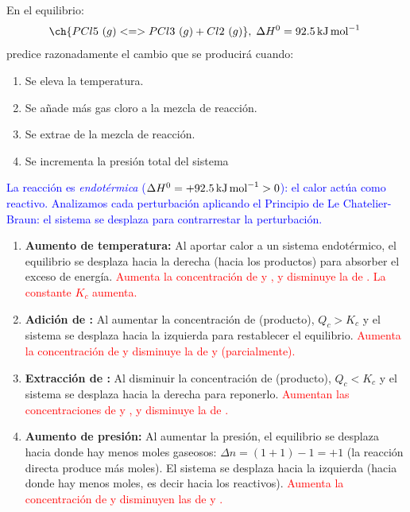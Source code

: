 \begin{exerciseEVAU}
    En el equilibrio:
    \begin{equation*}
        \ch{PCl5\ (g) <=> PCl3\ (g) + Cl2\ (g)},\; \Delta H^0 = \energia[kjmol]{92,5}
    \end{equation*}
    predice razonadamente el cambio que se producirá cuando:
    \begin{enumerate}[label=\letraminuscula]
        \item Se eleva la temperatura.
        \item Se añade más gas cloro a la mezcla de reacción.
        \item Se extrae  de la mezcla de reacción.
        \item Se incrementa la presión total del sistema
    \end{enumerate}

    \begin{solu}

    \textcolor{blue}{La reacción es \emph{endotérmica} (\(\Delta H^0 = +\qty{92{,}5}{\kJ\per\mol} > 0\)): el calor actúa como reactivo. Analizamos cada perturbación aplicando el Principio de Le Chatelier-Braun: el sistema se desplaza para contrarrestar la perturbación.}

    \begin{enumerate}[label=\letraminuscula]
        \item \textbf{Aumento de temperatura:} Al aportar calor a un sistema endotérmico, el equilibrio se desplaza hacia la derecha (hacia los productos) para absorber el exceso de energía. \textcolor{red}{Aumenta la concentración de  y , y disminuye la de . La constante \(K_c\) aumenta.}

        \item \textbf{Adición de :} Al aumentar la concentración de  (producto), \(Q_c > K_c\) y el sistema se desplaza hacia la izquierda para restablecer el equilibrio. \textcolor{red}{Aumenta la concentración de  y disminuye la de  y  (parcialmente).}

        \item \textbf{Extracción de :} Al disminuir la concentración de  (producto), \(Q_c < K_c\) y el sistema se desplaza hacia la derecha para reponerlo. \textcolor{red}{Aumentan las concentraciones de  y , y disminuye la de .}

        \item \textbf{Aumento de presión:} Al aumentar la presión, el equilibrio se desplaza hacia donde hay menos moles gaseosos: \(\Delta n = (1+1)-1 = +1\) (la reacción directa produce más moles). El sistema se desplaza hacia la izquierda (hacia donde hay menos moles, es decir hacia los reactivos). \textcolor{red}{Aumenta la concentración de  y disminuyen las de  y .}
    \end{enumerate}

    \end{solu}
\end{exerciseEVAU}
